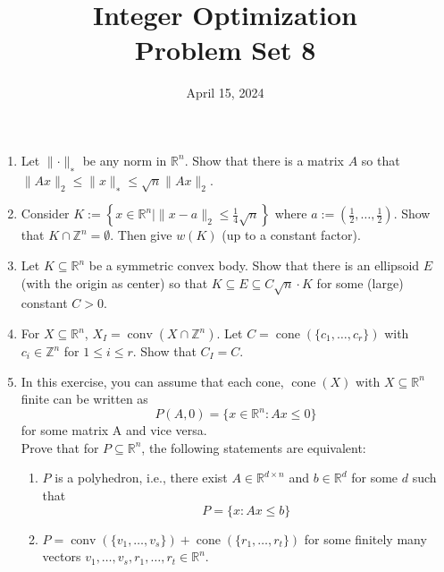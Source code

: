 \documentclass[11pt,a4paper]{article}
\title{Integer Optimization  \\ Problem Set 8 }
\date{ April 15, 2024}
\renewcommand{\leq}{\leqslant}
\DeclareMathOperator{\conv}{conv}
\DeclareMathOperator{\cone}{cone}
\begin{document}
\maketitle 


\begin{enumerate}

\item Let $∥\cdot∥_∗$ be any norm in $\mathbb{R}^n$. Show that there is a matrix $A$ so that $∥Ax∥_2 \leq ∥x∥_∗ \leq \sqrt{n}∥Ax∥_2$.

\item Consider $K:= \left\{x∈\mathbb{R}^n |∥x−a∥_2 \leq \frac{1}{4}\sqrt{n}\right\}$ where $a:=\left(\frac{1}{2},\hdots,\frac{1}{2}\right)$. Show that $K∩\mathbb{Z}^n =\emptyset$. Then give $w(K)$ (up to a constant factor).

\item Let $K ⊆\mathbb{R}^n$ be a symmetric convex body. Show that there is an ellipsoid $E$ (with the origin as center) so that $K ⊆ E ⊆ C\sqrt{n}\cdot K$ for some (large) constant $C >0$.

\item For $X⊆\mathbb{R}^n$, $X_I=\conv(X∩\mathbb{Z}^n)$.
Let $C=\cone(\{c_1,\hdots,c_r\})$ with $c_i ∈ \mathbb{Z}^n$ for $1\leq i\leq r$. Show that $C_I =C$.

\item In this exercise, you can assume that each cone, $\cone(X)$ with $X ⊆ \mathbb{R}^n$ finite can be written as $$P(A,0)=\{x∈\mathbb{R}^n: Ax\leq 0\}$$ for some matrix A and vice versa. \\
Prove that for $P ⊆ \mathbb{R}^n$, the following statements are equivalent:
\begin{enumerate}
    \item $P$ is a polyhedron, i.e., there exist $A ∈ \mathbb{R}^{d×n}$ and $b ∈ \mathbb{R}^d$ for some $d$ such that
$$P =\{x:Ax\leq b\}$$
\item $P =\conv(\{v_1,\hdots,v_s\})+\cone(\{r_1,\hdots,r_t\})$ for some finitely many vectors $v_1, \hdots, v_s, r_1, \hdots, r_t \in \mathbb{R}^n$. 
\end{enumerate}

\end{enumerate}


%
%


 
\end{document}
